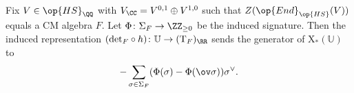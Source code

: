 \documentclass[../thesis.tex]{subfiles}
\begin{document}
\begin{proposition} \label{prop:signature-to-z-hg}
	Fix $V\in\op{HS}_\QQ$ with $V_\CC=V^{0,1}\oplus V^{1,0}$ such that $Z(\op{End}_{\op{HS}}(V))$ equals a CM algebra $F$. Let $\Phi\colon\Sigma_F\to\ZZ_{\ge0}$ be the induced signature. Then the induced representation $({\det_F}\circ h)\colon\mathbb U\to(\mathrm T_F)_\RR$ sends the generator of $\mathrm X_*(\mathbb U)$ to
	\[-\sum_{\sigma\in\Sigma_F}(\Phi(\sigma)-\Phi(\ov\sigma))\sigma^\lor.\]
\end{proposition}
\end{document}

